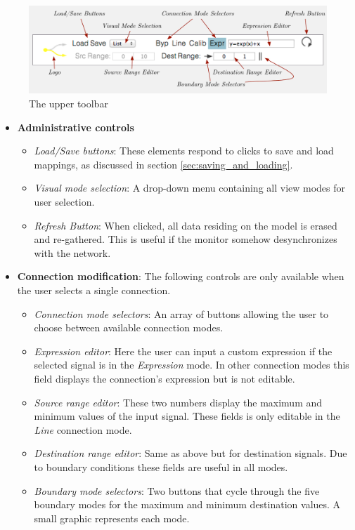 \begin{figure}[!ht]
\centering
	\includegraphics[width=1\textwidth]{figures/top_toolbar}
\caption{The upper toolbar}
\label{fig:toolbar}
\end{figure}

\begin{itemize}
	\item \textbf{Administrative controls}
	\begin{itemize}
		\item\emph{Load/Save buttons}: These elements respond to clicks to save and load mappings, as discussed in section \ref{sec:saving_and_loading}.
		\item\emph{Visual mode selection}: A drop-down menu containing all view modes for user selection.
		\item\emph{Refresh Button}: When clicked, all data residing on the model is erased and re-gathered. This is useful if the monitor somehow desynchronizes with the network.
	\end{itemize}

	\item \textbf{Connection modification}: The following controls are only available when the user selects a single connection.
	\begin{itemize}
		\item\emph{Connection mode selectors}: An array of buttons allowing the user to choose between available connection modes.
		\item\emph{Expression editor}: Here the user can input a custom expression if the selected signal is in the \emph{Expression} mode. In other connection modes this field displays the connection's expression but is not editable.
		\item\emph{Source range editor}: These two numbers display the maximum and minimum values of the input signal. These fields is only editable in the \emph{Line} connection mode.
		\item\emph{Destination range editor}: Same as above but for destination signals. Due to boundary conditions these fields are useful in all modes.
		\item\emph{Boundary mode selectors}: Two buttons that cycle through the five boundary modes for the maximum and minimum destination values. A small graphic represents each mode.
	\end{itemize}
\end{itemize}

